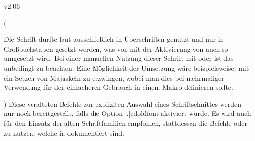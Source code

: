 \begin{Entity}{}
\begin{NoIndexDefault}
\begin{Cessations}{v2.06}
\begin{Cessation}
  {}
\begin{Cessation}
  {}
\begin{Cessation}
  {}
\begin{Cessation}
  {}
\begin{Cessation}
  {}
\begin{Cessation}
  {}
\begin{Cessation}
  {}
\begin{Cessation}
  {}
\begin{Cessation}
  {}
\begin{Cessation}
  {}
\begin{Cessation}
  {}
\begin{Cessation}
  {}
\begin{Cessation}
  {}
\begin{Cessation}
  {}
\begin{Cessation}
  {}
\begin{Cessation}
  {}
\begin{Cessation}
  {}
\begin{Cessation}
  {}
\printdeclarationlist(%
  \begin{quoting}
  \small%
  Die Schrift \DIN durfte laut \CD ausschließlich in Überschriften genutzt und 
  nur in Großbuchstaben gesetzt werden, was von \TUDScript mit der Aktivierung 
  von  auch so umgesetzt wird. Bei einer manuellen Nutzung 
  dieser Schrift mit  oder  ist das
  unbedingt zu beachten. Eine Möglichkeit der Umsetzung wäre beispielsweise, 
  mit  ein 
  Setzen von Majuskeln zu erzwingen, wobei man dies bei mehrmaliger Verwendung 
  für den einfacheren Gebrauch in einem Makro definieren sollte.
  \end{quoting}
)
%
Diese veralteten Befehle zur expliziten Auswahl eines Schriftschnittes werden 
nur noch bereitgestellt, falls die Option \Option|.|{cdoldfont} aktiviert 
wurde. Es wird auch für den Einsatz der alten Schriftfamilien empfohlen, 
stattdessen die Befehle  oder  zu 
nutzen, welche in  dokumentiert sind.

\end{Cessation}
\end{Cessation}
\end{Cessation}
\end{Cessation}
\end{Cessation}
\end{Cessation}
\end{Cessation}
\end{Cessation}
\end{Cessation}
\end{Cessation}
\end{Cessation}
\end{Cessation}
\end{Cessation}
\end{Cessation}
\end{Cessation}
\end{Cessation}
\end{Cessation}
\end{Cessation}
\end{Cessations}
\end{NoIndexDefault}
\end{Entity}
